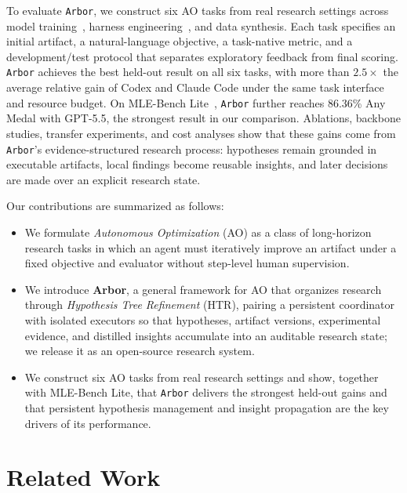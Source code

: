 \documentclass[]{selfevolagent}
\theoremstyle{plain}
\theoremstyle{definition}
\theoremstyle{remark}
\newcommand{\arbor}{\texttt{Arbor}}
\begin{document}
To evaluate \arbor{}, we construct six AO tasks from real research settings across model training~\citep{nanogptbench,autoresearch}, harness engineering~\citep{terminalbench,browsecomp}, and data synthesis. Each task specifies an initial artifact, a natural-language objective, a task-native metric, and a development/test protocol that separates exploratory feedback from final scoring. \arbor{} achieves the best held-out result on all six tasks, with more than $2.5\times$ the average relative gain of Codex and Claude Code under the same task interface and resource budget. On MLE-Bench Lite~\citep{mlebench}, \arbor{} further reaches 86.36\% Any Medal with GPT-5.5, the strongest result in our comparison. Ablations, backbone studies, transfer experiments, and cost analyses show that these gains come from \arbor{}'s evidence-structured research process: hypotheses remain grounded in executable artifacts, local findings become reusable insights, and later decisions are made over an explicit research state.

Our contributions are summarized as follows:

\begin{itemize}
\item We formulate \emph{Autonomous Optimization} (AO) as a class of long-horizon research tasks in which an agent must iteratively improve an artifact under a fixed objective and evaluator without step-level human supervision.
\item We introduce \textbf{Arbor}, a general framework for AO that organizes research through \emph{Hypothesis Tree Refinement} (HTR), pairing a persistent coordinator with isolated executors so that hypotheses, artifact versions, experimental evidence, and distilled insights accumulate into an auditable research state; we release it as an open-source research system.
\item We construct six AO tasks from real research settings and show, together with MLE-Bench Lite, that \arbor{} delivers the strongest held-out gains and that persistent hypothesis management and insight propagation are the key drivers of its performance.
\end{itemize}



\section{Related Work}\label{sec:related}
\end{document}
